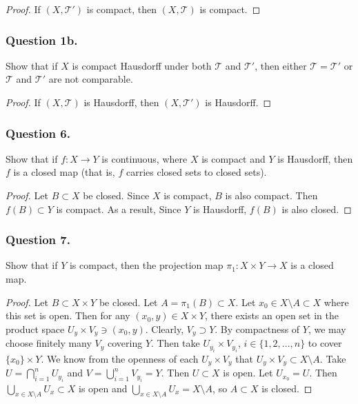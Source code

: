 \documentclass[12pt]{article}
\begin{document}
\begin{proof}
    If $(X, \mathcal{T'})$ is compact, then $(X, \mathcal{T})$ is compact.
\end{proof}

\subsubsection*{Question 1b.}
Show that if \( X \) is compact Hausdorff under both \( \mathcal{T} \) and 
\( \mathcal{T}' \), then either \( \mathcal{T} = \mathcal{T}' \) or
\( \mathcal{T} \) and \( \mathcal{T}' \) are not comparable.
\begin{proof}
    If $(X, \mathcal{T})$ is Hausdorff, then $(X, \mathcal{T}')$ is Hausdorff.
\end{proof}

\subsubsection*{Question 6.}
Show that if \( f : X \to Y \) is continuous, where \( X \) is compact and 
\( Y \) is Hausdorff, then \( f \) is a closed map (that is, \( f \) carries closed sets to closed sets).

\begin{proof}
    Let $B \subset X$ be closed.
    Since $X$ is compact, $B$ is also compact.
    Then $f(B) \subset Y$ is compact. As a result,
    Since $Y$ is Hausdorff, $f(B)$ is also closed.
\end{proof}

\subsubsection*{Question 7.}
Show that if $Y$ is compact, then the projection map
$\pi_1: X \times Y \rightarrow X$ is a closed map.

\begin{proof}
    Let $B \subset X \times Y$ be closed. 
    Let $A = \pi_1(B) \subset X$. Let 
    $x_0 \in X \setminus A \subset X$ where this set is open.
    Then for any $(x_0, y) \in X \times Y$, there exists an open
    set in the product space $U_y \times V_y \ni (x_0, y)$.
    Clearly, $V_y \supset Y$.
    By compactness of $Y$, we may choose finitely many $V_y$ covering $Y$.
    Then take $U_{y_i} \times V_{y_i}$, $i \in \{1,2,...,n\}$ to cover
    $\{x_0\} \times Y$. We know from the openness of each $U_y \times V_y$
    that $U_y \times V_y \subset X \setminus A$. Take $U = \bigcap_{i=1}^n U_{y_i}$ and 
    $V = \bigcup_{i=1}^n V_{y_i} = Y$. Then $U \subset X$ is open. Let $U_{x_0} = U$.
    Then $\bigcup_{x \in X \setminus A} U_x \subset X$ is open and 
    $\bigcup_{x \in X \setminus A} U_x = X \setminus A$, so $A \subset X$ is closed.

\end{proof}
\end{document}
